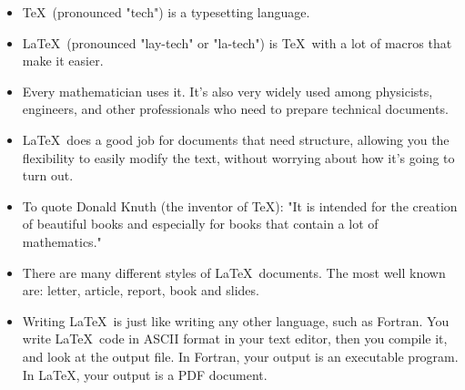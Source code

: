 \documentclass[12pt]{book}
\begin{document}
\begin{itemize}
\item \TeX~(pronounced "tech") is a typesetting language.
\item \LaTeX~(pronounced "lay-tech" or "la-tech") is \TeX~with a lot of macros that make it easier.
\item Every mathematician uses it. It's also very widely used among physicists, engineers, and other
      professionals who need to prepare technical documents.
\item \LaTeX~does a good job for documents that need structure, allowing you the
      flexibility to easily modify the text, without worrying about how it's going to
      turn out.
\item To quote Donald Knuth (the inventor of \TeX): "It is intended for the
      creation of beautiful books and especially for books that contain a lot
      of mathematics."
\item There are many different styles of \LaTeX~documents. The most well known are: letter,
      article, report, book and slides.
\item Writing \LaTeX~is just like writing any other language, such as Fortran. You
      write \LaTeX~code in ASCII format in your text editor, then you compile it,
      and look at the output file. In Fortran, your output is an executable program.
      In \LaTeX, your output is a PDF document.
\end{itemize}

 \label{ch2}
\end{document}
